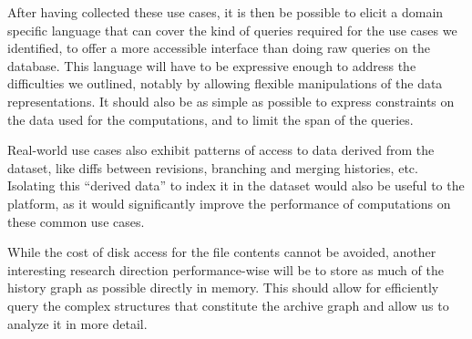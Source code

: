 After having collected these use cases, it is then be possible to elicit a
domain specific language that can cover the kind of queries required
for the use cases we identified, to offer a more accessible interface than
doing raw queries on the database. This language will have to be expressive
enough to address the difficulties we outlined, notably by allowing flexible
manipulations of the data representations. It should also be as simple as
possible to express constraints on the data used for the computations, and to
limit the span of the queries.

Real-world use cases also exhibit patterns of access to data derived from
the dataset, like diffs between revisions, branching and merging histories,
etc. Isolating this ``derived data'' to index it in the dataset would also be
useful to the platform, as it would significantly improve the performance of
computations on these common use cases.

While the cost of disk access for the file contents cannot be avoided, another
interesting research direction performance-wise will be to store as much of the
history graph as possible directly in memory. This should allow for efficiently
query the complex structures that constitute the archive graph and allow us to
analyze it in more detail.
